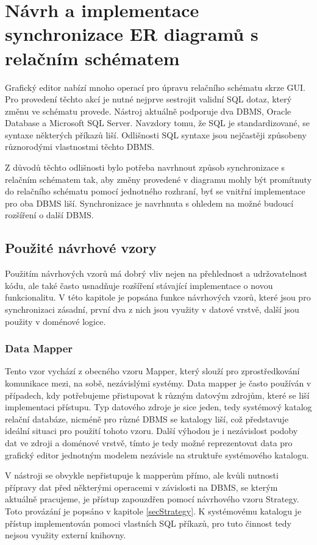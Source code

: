 \documentclass[czech,bachelor,public,dept460,male,oneside]{diploma}
\begin{document}
\newpage
\section{Návrh a implementace synchronizace ER diagramů s relačním schématem}
Grafický editor nabízí mnoho operací pro úpravu relačního schématu skrze GUI. Pro provedení těchto akcí je nutné nejprve sestrojit validní SQL dotaz, který změnu ve schématu provede. Nástroj aktuálně podporuje dva DBMS, Oracle Database a Microsoft SQL Server. Navzdory tomu, že SQL je standardizované, se syntaxe některých příkazů liší. Odlišnosti SQL syntaxe jsou nejčastěji způsobeny různorodými vlastnostmi těchto DBMS. 

Z důvodů těchto odlišnosti bylo potřeba navrhnout způsob synchronizace s relačním schématem tak, aby změny provedené v diagramu mohly být promítnuty do relačního schématu pomocí jednotného rozhraní, byť se vnitřní implementace pro oba DBMS liší. Synchronizace je navrhnuta s ohledem na možné budoucí rozšíření o další DBMS.
	
	\subsection{Použité návrhové vzory}
	Použitím návrhových vzorů má dobrý vliv nejen na přehlednost a udržovatelnost kódu, ale také často usnadňuje rozšíření stávající implementace o novou funkcionalitu.  V této kapitole je popsána funkce návrhových vzorů, které jsou pro synchronizaci zásadní, první dva z nich jsou využity v datové vrstvě, další jsou použity v doménové logice.
	
		\subsubsection{Data Mapper}
		Tento vzor vychází z obecného vzoru Mapper, který slouží pro zprostředkování komunikace mezi, na sobě, nezávislými systémy. Data mapper je často používán v případech, kdy potřebujeme přistupovat k různým datovým zdrojům, které se liší implementaci přístupu. Typ datového zdroje je sice jeden, tedy systémový katalog relační databáze, nicméně pro různé DBMS se katalogy liší, což představuje ideální situaci pro použití tohoto vzoru. Další výhodou je i nezávislost podoby dat ve zdroji a doménové vrstvě, tímto je tedy možné reprezentovat data pro grafický editor jednotným modelem nezávisle na struktuře systémového katalogu.
		
		V nástroji se obvykle nepřistupuje k mapperům přímo, ale kvůli nutnosti přípravy dat před některými operacemi v závislosti na DBMS, se kterým aktuálně pracujeme, je přístup zapouzdřen pomocí návrhového vzoru Strategy. Toto provázání je popsáno v kapitole \ref{secStrategy}. K systémovému katalogu je přístup implementován pomoci vlastních SQL příkazů, pro tuto činnost tedy nejsou využity externí knihovny.
		
\end{document}

